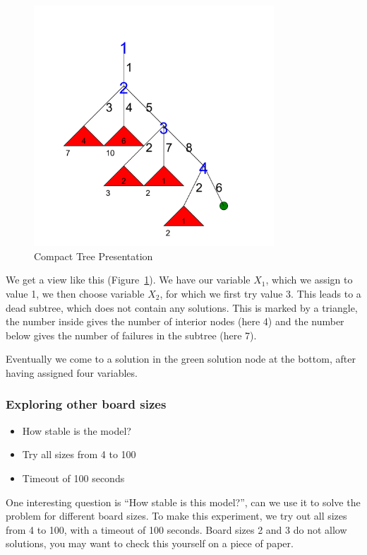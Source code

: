 \begin{figure}[h]
\caption{\label{nqueen:compact} Compact Tree Presentation}
\begin{center}
\includegraphics[width=9cm]{../nqueen/compact/tree_compact}
\end{center}
\end{figure}

We get a view like this (Figure~\ref{nqueen:compact}). We have our variable $X_1$, which we assign to value 1, we then choose variable $X_2$, for which we first try value 3. This leads to a dead subtree, which does not contain any solutions. This is marked by a triangle, the number inside gives the number of interior nodes (here 4) and the number below gives the number of failures in the subtree (here 7). 

Eventually we come to a solution in the green solution node at the bottom, after having assigned four variables.


\begin{frame}
\frametitle{Exploring other board sizes}
\begin{itemize}
\item How stable is the model?
\item Try all sizes from 4 to 100
\item Timeout of 100 seconds
\end{itemize}
\end{frame}

One interesting question is ``How stable is this model?'', can we use it to solve the problem for different board sizes. To make this experiment, we try out all sizes from 4 to 100, with a timeout of 100 seconds. Board sizes 2 and 3 do not allow solutions, you may want to check this yourself on a piece of paper.

